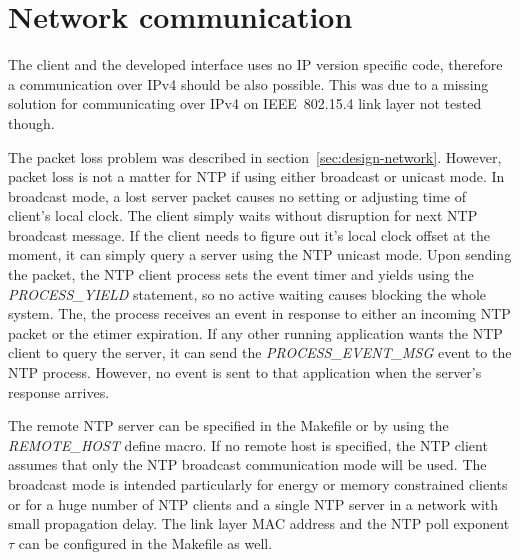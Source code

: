 
\section{Network communication}
The client and the developed interface uses no IP version specific code,
therefore a communication over IPv4 should be also possible.
This was due to a missing solution for
communicating over IPv4 on IEEE~802.15.4 link layer not tested though.

The packet loss problem was described in section~\ref{sec:design-network}.
However, packet loss is not a matter for NTP if using either broadcast or unicast mode.
In broadcast mode, a lost server packet causes no setting or adjusting time of client's
local clock.
The client simply waits without disruption for next NTP broadcast message.
If the client needs to figure out it's local clock offset at the moment,
it can simply query a server using the NTP unicast mode.
Upon sending the packet, the NTP client process sets the event timer and yields
using the {\it{PROCESS\_YIELD}} statement, so no active waiting
causes blocking the whole system.
The, the process receives an event in response to either an incoming NTP packet
or the etimer expiration.
If any other running application wants the NTP client to query the server,
it can send the {\it{PROCESS\_EVENT\_MSG}} event to the NTP process.
However, no event is sent to that application when the server's response arrives.

The remote NTP server can be specified in the Makefile or
by using the {\it{REMOTE\_HOST}} define macro.
If no remote host is specified, the NTP client assumes that only the NTP broadcast communication mode will be used.
The broadcast mode is intended particularly for energy or memory constrained clients
or for a huge number of NTP clients and a single NTP server
in a network with small propagation delay.
The link layer MAC address and the NTP poll exponent $\tau$
can be configured in the Makefile as well.


